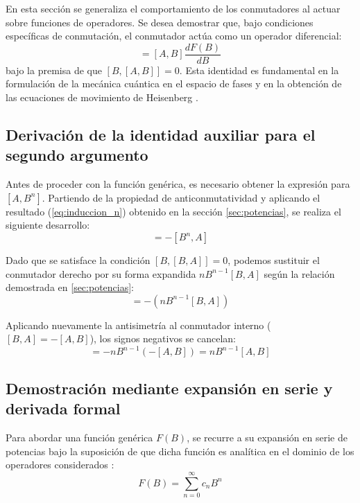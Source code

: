 \documentclass[11pt,a4paper,spanish]{book}
\begin{document}
En esta sección se generaliza el comportamiento de los conmutadores al actuar sobre funciones de operadores. Se desea demostrar que, bajo condiciones específicas de conmutación, el conmutador actúa como un operador diferencial:
\begin{equation}
[A, F(B)] = [A, B] \frac{dF(B)}{dB} \label{eq:conmutador_f_b}
\end{equation}
bajo la premisa de que $[B, [A, B]] = 0$. Esta identidad es fundamental en la formulación de la mecánica cuántica en el espacio de fases y en la obtención de las ecuaciones de movimiento de Heisenberg \citep{messiah1961}.

\subsection{Derivación de la identidad auxiliar para el segundo argumento}
Antes de proceder con la función genérica, es necesario obtener la expresión para $[A, B^n]$. Partiendo de la propiedad de anticonmutatividad y aplicando el resultado (\ref{eq:induccion_n}) obtenido en la sección \ref{sec:potencias}, se realiza el siguiente desarrollo:
\begin{equation}
[A, B^n] = - [B^n, A]
\end{equation}

Dado que se satisface la condición $[B, [B, A]] = 0$, podemos sustituir el conmutador derecho por su forma expandida $n B^{n-1} [B, A]$ según la relación demostrada en \ref{sec:potencias}:
\begin{equation}
[A, B^n] = - (n B^{n-1} [B, A])
\end{equation}

Aplicando nuevamente la antisimetría al conmutador interno ($[B, A] = -[A, B]$), los signos negativos se cancelan:
\begin{equation}
[A, B^n] = - n B^{n-1} (-[A, B]) = n B^{n-1} [A, B] \label{eq:auxiliar_b}
\end{equation}

\subsection{Demostración mediante expansión en serie y derivada formal}

Para abordar una función genérica $F(B)$, se recurre a su expansión en serie de potencias bajo la suposición de que dicha función es analítica en el dominio de los operadores considerados \citep{wilcox1967}:
\begin{equation}
F(B) = \sum_{n=0}^{\infty} c_n B^n \label{eq:taylor}
\end{equation}
\end{document}
